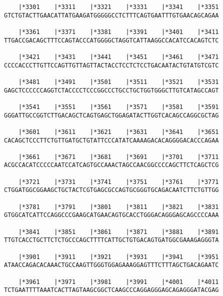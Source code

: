 \documentclass{article}
\begin{document}
\begin{Verbatim}
    |*3301    |*3311    |*3321    |*3331    |*3341    |*3351
GTCTGTACTTGAACATTATGAAGATGGGGGCCTCTTTCAGTGAATTTGTGAACAGCAGAA
                                                            
    |*3361    |*3371    |*3381    |*3391    |*3401    |*3411
TTGACCGACAGCTTTCCAGTACCCATGGGGCTAGGTCATTAAGGCCACATCCACAGTCTC
                                                            
    |*3421    |*3431    |*3441    |*3451    |*3461    |*3471
CCCCACCCTTGTTCCAGTTGTTAGTTACTACCTCCTCTCCTGACAATACTGTATGTCGTC
                                                            
    |*3481    |*3491    |*3501    |*3511    |*3521    |*3531
GAGCTCCCCCCAGGTCTACCCCTCCCGGCCCTGCCTGCTGGTGGGCTTGTCATAGCCAGT
                                                            
    |*3541    |*3551    |*3561    |*3571    |*3581    |*3591
GGGATTGCCGGTCTTGACAGCTCAGTGAGCTGGAGATACTTGGTCACAGCCAGGCGCTAG
                                                            
    |*3601    |*3611    |*3621    |*3631    |*3641    |*3651
CACAGCTCCCTTCTGTTGATGCTGTATTCCCATATCAAAAGACACAGGGGACACCCAGAA
                                                            
    |*3661    |*3671    |*3681    |*3691    |*3701    |*3711
ACGCCACATCCCCCAATCCATCAGTGCCAAACTAGCCAACGGCCCCAGCTTCTCAGCTCG
                                                            
    |*3721    |*3731    |*3741    |*3751    |*3761    |*3771
CTGGATGGCGGAAGCTGCTACTCGTGAGCGCCAGTGCGGGTGCAGACAATCTTCTGTTGG
                                                            
    |*3781    |*3791    |*3801    |*3811    |*3821    |*3831
GTGGCATCATTCCAGGCCCGAAGCATGAACAGTGCACCTGGGACAGGGAGCAGCCCCAAA
                                                            
    |*3841    |*3851    |*3861    |*3871    |*3881    |*3891
TTGTCACCTGCTTCTCTGCCCAGCTTTTCATTGCTGTGACAGTGATGGCGAAAGAGGGTA
                                                            
    |*3901    |*3911    |*3921    |*3931    |*3941    |*3951
ATAACCAGACACAAACTGCCAAGTTGGGTGGAGAAAGGAGTTTCTTTAGCTGACAGAATC
                                                            
    |*3961    |*3971    |*3981    |*3991    |*4001    |*4011
TCTGAATTTTAAATCACTTAGTAAGCGGCTCAAGCCCAGGAGGGAGCAGAGGGATACGAG
                                                            

\end{Verbatim}
\end{document}

